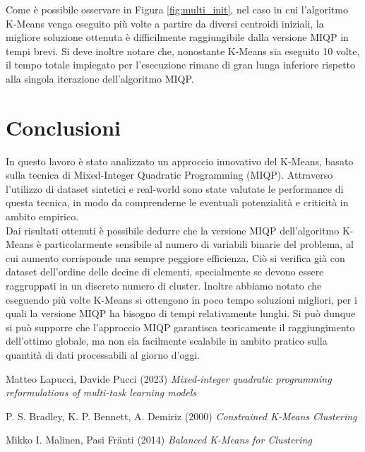 \documentclass{article}
\begin{document}
    Come è possibile osservare in Figura \ref{fig:multi_init}, nel caso in cui l'algoritmo K-Means venga eseguito più volte a partire da diversi centroidi iniziali, la migliore soluzione ottenuta è difficilmente raggiungibile dalla versione MIQP in tempi brevi. Si deve inoltre notare che, nonostante K-Means sia eseguito 10 volte, il tempo totale impiegato per l'esecuzione rimane di gran lunga inferiore rispetto alla singola iterazione dell'algoritmo MIQP.

    \section{Conclusioni}
    In questo lavoro è stato analizzato un approccio innovativo del K-Means, basato sulla tecnica di Mixed-Integer Quadratic Programming (MIQP). Attraverso l'utilizzo di dataset sintetici e real-world sono state valutate le performance di questa tecnica, in modo da comprenderne le eventuali potenzialità e criticità in ambito empirico.\\
    Dai risultati ottenuti è possibile dedurre che la versione MIQP dell'algoritmo K-Means è particolarmente sensibile al numero di variabili binarie del problema, al cui aumento corrisponde una sempre peggiore efficienza. Ciò si verifica già con dataset dell'ordine delle decine di elementi, specialmente se devono essere raggruppati in un discreto numero di cluster.
    Inoltre abbiamo notato che eseguendo più volte K-Means si ottengono in poco tempo soluzioni migliori, per i quali la versione MIQP ha bisogno di tempi relativamente lunghi.
    Si può dunque si può supporre che l'approccio MIQP garantisca teoricamente il raggiungimento dell'ottimo globale, ma non sia facilmente scalabile in ambito pratico sulla quantità di dati processabili al giorno d'oggi.


    \begin{thebibliography}{9}
Matteo Lapucci, Davide Pucci (2023) \emph{Mixed-integer quadratic programming reformulations of multi-task learning models}

P. S. Bradley, K. P. Bennett, A. Demiriz (2000) \emph{Constrained K-Means Clustering}

Mikko I. Malinen, Pasi Fränti (2014) \emph{Balanced K-Means for Clustering}

\end{thebibliography}
\end{document}
